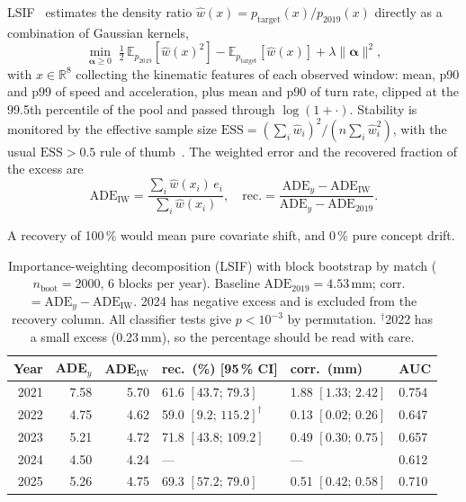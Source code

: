 \documentclass[conference]{IEEEtran}
\newif\ifmarkchanges
\newcommand{\ins}[1]{\ifmarkchanges\hl{\footnotesize[+ #1]}\fi}
\begin{document}
LSIF~\cite{kliep,kanamori2009,sugiyama_book} estimates the density ratio
$\hat{w}(x) = p_{\text{target}}(x)/p_{2019}(x)$ directly as a combination of
Gaussian kernels,\ins{define os coeficientes $\boldsymbol\alpha$}
\begin{equation}\label{eq:lsif}
\min_{\boldsymbol\alpha \geq 0}\;
\tfrac{1}{2}\,\mathbb{E}_{p_{2019}}[\hat{w}(x)^2] -
\mathbb{E}_{p_{\text{target}}}[\hat{w}(x)] + \lambda\|\boldsymbol\alpha\|^2 ,
\end{equation}
with $x \in \mathbb{R}^{8}$ collecting the kinematic features of each observed
window: mean, p90 and p99 of speed and acceleration, plus mean and p90 of turn
rate, clipped at the 99.5th percentile of the pool and passed through
$\log(1+\cdot)$. Stability is monitored by the effective sample size
$\mathrm{ESS} = (\sum_i \hat{w}_i)^2/(n\sum_i \hat{w}_i^2)$, with the usual
$\mathrm{ESS} > 0.5$ rule of thumb~\cite{sugiyama_book}. The weighted error and
the recovered fraction of the excess are
\begin{equation}\label{eq:recovery}
\mathrm{ADE}_{\mathrm{IW}} = \frac{\sum_i \hat{w}(x_i)\,e_i}{\sum_i \hat{w}(x_i)},
\quad
\mathrm{rec.} = \frac{\mathrm{ADE}_y - \mathrm{ADE}_{\mathrm{IW}}}
                     {\mathrm{ADE}_y - \mathrm{ADE}_{2019}} .
\end{equation}
\ins{define $e_i$ e $\mathrm{ADE}_y$}
A recovery of 100\,\% would mean pure covariate shift, and 0\,\% pure concept
drift.

\begin{table}[!t]
\centering
\caption{Importance-weighting decomposition (LSIF) with block bootstrap by
match ($n_{\text{boot}} = 2000$, 6 blocks per year). Baseline
$\mathrm{ADE}_{2019} = 4.53$\,mm; corr.\ $= \mathrm{ADE}_y -
\mathrm{ADE}_{\mathrm{IW}}$. 2024 has negative excess and is excluded from the
recovery column. All classifier tests give $p < 10^{-3}$ by permutation.
$^{\dagger}$2022 has a small excess (0.23\,mm), so the percentage should be
read with care.}
\label{tab:iw}
\footnotesize
\setlength{\tabcolsep}{3pt}
\begin{tabular}{@{}rrrlll@{}}
\toprule
\textbf{Year} & \textbf{ADE$_y$} & \textbf{ADE$_{\mathrm{IW}}$}
 & \textbf{rec.\ (\%) [95\,\% CI]} & \textbf{corr.\ (mm)} & \textbf{AUC} \\
\midrule
2021 & 7.58 & 5.70 & 61.6 $[43.7;\,79.3]$          & 1.88 $[1.33;\,2.42]$ & 0.754 \\
2022 & 4.75 & 4.62 & 59.0 $[9.2;\,115.2]^{\dagger}$ & 0.13 $[0.02;\,0.26]$ & 0.647 \\
2023 & 5.21 & 4.72 & 71.8 $[43.8;\,109.2]$          & 0.49 $[0.30;\,0.75]$ & 0.657 \\
2024 & 4.50 & 4.24 & ---                            & ---                  & 0.612 \\
2025 & 5.26 & 4.75 & 69.3 $[57.2;\,79.0]$           & 0.51 $[0.42;\,0.58]$ & 0.710 \\
\bottomrule
\end{tabular}
\end{table}
\end{document}
